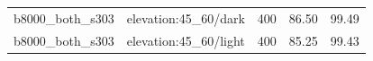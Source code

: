 \begin{longtable}{l>{\raggedright\arraybackslash}p{.42\linewidth}rrr}
b8000\_\allowbreak{}both\_\allowbreak{}s303 & %
elevation:45\_\allowbreak{}60/dark & %
400 & %
86.50 & %
99.49 \\ %

b8000\_\allowbreak{}both\_\allowbreak{}s303 & %
elevation:45\_\allowbreak{}60/light & %
400 & %
85.25 & %
99.43 \\ %


\end{longtable}
